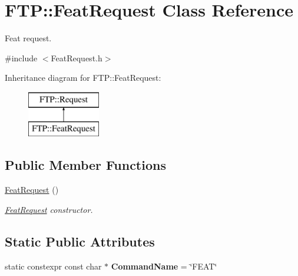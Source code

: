 \hypertarget{classFTP_1_1FeatRequest}{}\section{F\+T\+P\+:\+:Feat\+Request Class Reference}
\label{classFTP_1_1FeatRequest}


Feat request.  




{\ttfamily \#include $<$Feat\+Request.\+h$>$}

Inheritance diagram for F\+T\+P\+:\+:Feat\+Request\+:\begin{figure}[H]
\begin{center}
\leavevmode
\includegraphics[height=2.000000cm]{classFTP_1_1FeatRequest}
\end{center}
\end{figure}
\subsection*{Public Member Functions}
\begin{DoxyCompactItemize}
\item 
\hypertarget{classFTP_1_1FeatRequest_a3f4a0e055a9fcacd680c8550f1410229}{}\hyperlink{classFTP_1_1FeatRequest_a3f4a0e055a9fcacd680c8550f1410229}{Feat\+Request} ()\label{classFTP_1_1FeatRequest_a3f4a0e055a9fcacd680c8550f1410229}

\begin{DoxyCompactList}\small\item\em \hyperlink{classFTP_1_1FeatRequest}{Feat\+Request} constructor. \end{DoxyCompactList}\end{DoxyCompactItemize}
\subsection*{Static Public Attributes}
\begin{DoxyCompactItemize}
\item 
\hypertarget{classFTP_1_1FeatRequest_aa42ff5dc78f3d80b1944ee80f0340017}{}static constexpr const char $\ast$ {\bfseries Command\+Name} = \char`\"{}F\+E\+A\+T\char`\"{}\label{classFTP_1_1FeatRequest_aa42ff5dc78f3d80b1944ee80f0340017}

\end{DoxyCompactItemize}


